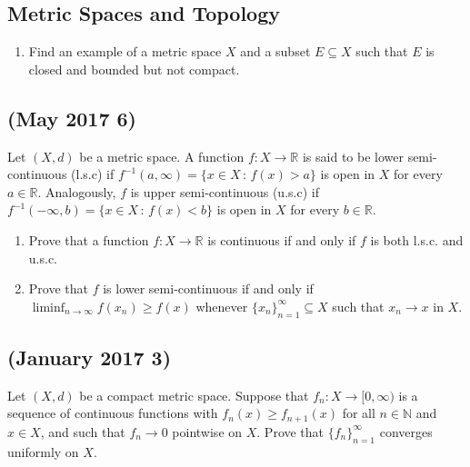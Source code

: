 \hypertarget{metric-spaces-and-topology-1}{%
\subsection*{Metric Spaces and
Topology}\label{metric-spaces-and-topology-1}}

\begin{enumerate}
\def\labelenumi{\arabic{enumi}.}
\tightlist
\item
  Find an example of a metric space \(X\) and a subset \(E \subseteq X\)
  such that \(E\) is closed and bounded but not compact.
\end{enumerate}

\hypertarget{may-2017-6}{%
\subsection{(May 2017 6)}\label{may-2017-6}}

Let \((X,d)\) be a metric space. A function
\(f \colon X \to \mathbb{R}\) is said to be lower semi-continuous
(l.s.c) if \(f^{-1}(a,\infty) = \{x \in X \, \colon \, f(x)> a\}\) is
open in \(X\) for every \(a \in \mathbb{R}\). Analogously, \(f\) is
upper semi-continuous (u.s.c) if
\(f^{-1}(-\infty, b) = \{x \in X \, \colon \, f(x)<b\}\) is open in
\(X\) for every \(b \in \mathbb{R}\).

\begin{enumerate}
\def\labelenumi{\arabic{enumi}.}
\item
  Prove that a function \(f \colon X \to \mathbb{R}\) is continuous if
  and only if \(f\) is both l.s.c. and u.s.c.
\item
  Prove that \(f\) is lower semi-continuous if and only if
  \(\liminf_{n \to \infty} f(x_n) \geq f(x)\) whenever
  \(\{x_n\}_{n=1}^\infty \subseteq X\) such that \(x_n \to x\) in \(X\).
\end{enumerate}

\hypertarget{january-2017-3}{%
\subsection{(January 2017 3)}\label{january-2017-3}}

Let \((X,d)\) be a compact metric space. Suppose that
\(f_n \colon X \to [0,\infty)\) is a sequence of continuous functions
with \(f_n(x) \geq f_{n+1}(x)\) for all \(n \in \mathbb{N}\) and
\(x \in X\), and such that \(f_n \to 0\) pointwise on \(X\). Prove that
\(\{f_n\}_{n=1}^\infty\) converges uniformly on \(X\).

